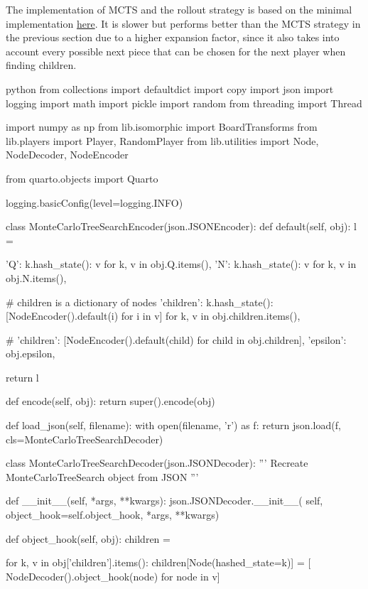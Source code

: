 The implementation of MCTS and the rollout strategy is based on the minimal implementation \href{https://gist.github.com/qpwo/c538c6f73727e254fdc7fab81024f6e1}{here}. It is slower but performs better than the MCTS strategy in the previous section due to a higher expansion factor, since it also takes into account every possible next piece that can be chosen for the next player when finding children.

\begin{mintedbox}{python}
from collections import defaultdict
import copy
import json
import logging
import math
import pickle
import random
from threading import Thread

import numpy as np
from lib.isomorphic import BoardTransforms
from lib.players import Player, RandomPlayer
from lib.utilities import Node, NodeDecoder, NodeEncoder

from quarto.objects import Quarto

logging.basicConfig(level=logging.INFO)


class MonteCarloTreeSearchEncoder(json.JSONEncoder):
    def default(self, obj):
        l = {
            'Q': {k.hash_state(): v for k, v in obj.Q.items()},
            'N': {k.hash_state(): v for k, v in obj.N.items()},

            # children is a dictionary of nodes
            'children': {k.hash_state(): [NodeEncoder().default(i) for i in v] for k, v in obj.children.items()},

            # 'children': [NodeEncoder().default(child) for child in obj.children],
            'epsilon': obj.epsilon,
        }
        return l

    def encode(self, obj):
        return super().encode(obj)

    def load_json(self, filename):
        with open(filename, 'r') as f:
            return json.load(f, cls=MonteCarloTreeSearchDecoder)


class MonteCarloTreeSearchDecoder(json.JSONDecoder):
    '''
    Recreate MonteCarloTreeSearch object from JSON
    '''

    def __init__(self, *args, **kwargs):
        json.JSONDecoder.__init__(
            self, object_hook=self.object_hook, *args, **kwargs)

    def object_hook(self, obj):
        children = {}

        for k, v in obj['children'].items():
            children[Node(hashed_state=k)] = [
                NodeDecoder().object_hook(node) for node in v]


\end{mintedbox}
